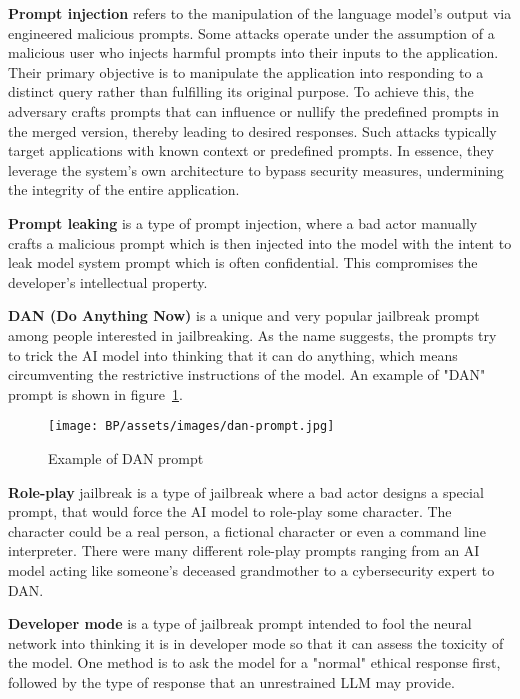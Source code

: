 \textbf{Prompt injection} refers to the manipulation of the language model's output via engineered malicious prompts. Some attacks operate under the assumption of a malicious user who injects harmful prompts into their inputs to the application. Their primary objective is to manipulate the application into responding to a distinct query rather than fulfilling its original purpose. To achieve this, the adversary crafts prompts that can influence or nullify the predefined prompts in the merged version, thereby leading to desired responses. Such attacks typically target applications with known context or predefined prompts. In essence, they leverage the system's own architecture to bypass security measures, undermining the integrity of the entire application\cite{liu2024promptinjectionattackllmintegrated}.

\textbf{Prompt leaking} is a type of prompt injection, where a bad actor manually crafts a malicious prompt which is then injected into the model with the intent to leak model system prompt which is often confidential. This compromises the developer’s intellectual property.

\textbf{DAN (Do Anything Now)} is a unique and very popular jailbreak prompt among people interested in jailbreaking. As the name suggests, the prompts try to trick the AI model into thinking that it can do anything, which means circumventing the restrictive instructions of the model. An example of "DAN" prompt is shown in figure~\ref{fig:dan-prompt}.

\begin{figure}[ht]
\begin{centering}
\texttt{[image: BP/assets/images/dan-prompt.jpg]}
\par\end{centering}
\caption{Example of 
 DAN prompt\cite{reddit_pic}
 \label{fig:dan-prompt}}
\end{figure}


\textbf{Role-play} jailbreak is a type of jailbreak where a bad actor designs a special prompt, that would force the AI model to role-play some character. The character could be a real person, a fictional character or even a command line interpreter. There were many different role-play prompts ranging from an AI model acting like someone's deceased grandmother to a cybersecurity expert to DAN.


\textbf{Developer mode} is a type of jailbreak prompt intended to fool the neural network into thinking it is in developer mode so that it can assess the toxicity of the model. One method is to ask the model for a "normal" ethical response first, followed by the type of response that an unrestrained LLM may provide.


